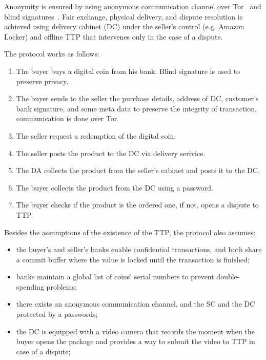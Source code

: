 \documentclass[pdftex,twocolumn,epjc3]{svjour3}
\begin{document}
Anonymity is ensured by using anonymous communication channel over Tor~\cite{dingledineTorSecondGenerationOnion2004} and blind signatures~\cite{chaumSecurityIdentificationTransaction1985}. Fair exchange, physical delivery, and dispute resolution is achieved using delivery cabinet (DC) under the seller's control (e.g. Amazon Locker) and offline TTP that intervenes only in the case of a dispute.

The protocol works as follows: 

\begin{enumerate}
    \item The buyer buys a digital coin from his bank. Blind signature is used to preserve privacy.
    \item The buyer sends to the seller the purchase details, address of DC, customer's bank signature, and some meta data to preserve the integrity of transaction, communication is done over Tor.
    \item The seller request a redemption of the digital coin.
    \item The seller posts the product to the DC via delivery serivice.
    \item The DA collects the product from the seller's cabinet and posts it to the DC.
    \item The buyer collects the product from the DC using a password.
    \item The buyer checks if the product is the ordered one, if not, opens a dispute to TTP.
\end{enumerate}

Besides the assumptions of the existence of the TTP, the protocol also assumes:

\begin{itemize}
    \item the buyer's and seller's banks enable confidential transactions, and both share a commit buffer where the value is locked until the transaction is finished;
    \item banks maintain a global list of coins' serial numbers to prevent double-spending problems;
    \item there exists an anonymous communication channel, and the SC and the DC protected by a passwords;
    \item the DC is equipped with a video camera that records the moment when the buyer opens the package and provides a way to submit the video to TTP in case of a dispute;
\end{itemize}
\end{document}
